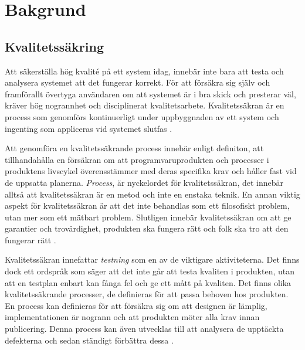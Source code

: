 \clearpage

\section{Bakgrund}
\label{sec:background-wallstrom}
\subsection{Kvalitetssäkring}
Att säkerställa hög kvalité på ett system idag, innebär inte bara att testa och analysera systemet att det fungerar korrekt. För att försäkra sig själv och framförallt övertyga användaren om att systemet är i bra skick och presterar väl, kräver hög nogrannhet och disciplinerat kvalitetsarbete. Kvalitetssäkran är en process som genomförs kontinuerligt under uppbyggnaden av ett system och ingenting som appliceras vid systemet slutfas \cite{feldman2005quality}.

Att genomföra en kvalitetssäkrande process innebär enligt definiton, att tillhandahålla en försäkran om att programvaruprodukten och processer i produktens livscykel överensstämmer med deras specifika krav och håller fast vid de uppsatta planerna. \textit{Process}, är nyckelordet för kvalitetssäkran, det innebär alltså att kvalitetssäkran är en metod och inte en enstaka teknik. En annan viktig aspekt för kvalitetssäkran är att det inte behandlas som ett filosofiskt problem, utan mer som ett mätbart problem. Slutligen innebär kvalitetssäkran om att ge garantier och trovärdighet, produkten ska fungera rätt och folk ska tro att den fungerar rätt \cite{feldman2005quality}.

Kvalitetssäkran innefattar \textit{testning} som en av de viktigare aktiviteterna. Det finns dock ett ordspråk som säger att det inte går att testa kvaliten i produkten, utan att en testplan enbart kan fånga fel och ge ett mått på kvaliten. Det finns olika kvalitetssäkrande processer, de definieras för att passa behoven hos produkten. En process kan definieras för att försäkra sig om att designen är lämplig, implementationen är nogrann och att produkten möter alla krav innan publicering. Denna process kan även utvecklas till att analysera de upptäckta defekterna och sedan ständigt förbättra dessa \cite{feldman2005quality}.


